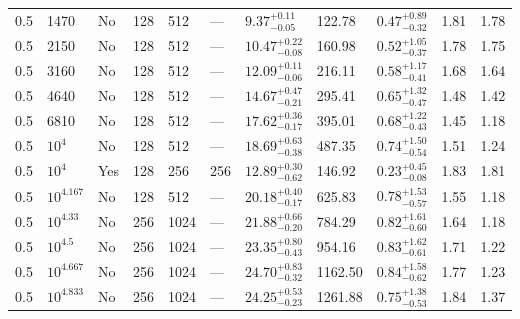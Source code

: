 \documentclass[aps, prfluids, onecolumn, notitlepage, nofootinbib, groupedaddress, amsfonts, amssymb, amsmath]{revtex4-1}
\begin{document}
\begin{center}
\begin{longtable}{ p{1cm} p{1cm} p{1cm} p{1cm} p{1cm} p{1cm} p{1.75cm} p{1.5cm} p{2.75cm} p{1cm} p{1.2cm}  }
\vspace{0.08cm}0.5	&	1470	&	No	&	128	&	512	&	---	&$	9.37	_{-	0.05	}^{+	0.11	}$&	122.78	&$	0.47	_{-	0.32	}^{+	0.89	}$&	1.81	&	1.78	\\
\vspace{0.08cm}0.5	&	2150	&	No	&	128	&	512	&	---	&$	10.47	_{-	0.08	}^{+	0.22	}$&	160.98	&$	0.52	_{-	0.37	}^{+	1.05	}$&	1.78	&	1.75	\\
\vspace{0.08cm}0.5	&	3160	&	No	&	128	&	512	&	---	&$	12.09	_{-	0.06	}^{+	0.11	}$&	216.11	&$	0.58	_{-	0.41	}^{+	1.17	}$&	1.68	&	1.64	\\
\vspace{0.08cm}0.5	&	4640	&	No	&	128	&	512	&	---	&$	14.67	_{-	0.21	}^{+	0.47	}$&	295.41	&$	0.65	_{-	0.47	}^{+	1.32	}$&	1.48	&	1.42	\\
\vspace{0.08cm}0.5	&	6810	&	No	&	128	&	512	&	---	&$	17.62	_{-	0.17	}^{+	0.36	}$&	395.01	&$	0.68	_{-	0.43	}^{+	1.22	}$&	1.45	&	1.18	\\
\vspace{0.08cm}0.5	&	$10^4$	&	No	&	128	&	512	&	---	&$	18.69	_{-	0.38	}^{+	0.63	}$&	487.35	&$	0.74	_{-	0.54	}^{+	1.50	}$&	1.51	&	1.24	\\
\vspace{0.08cm}0.5	&	$10^4$	&	Yes	&	128	&	256	&	256	&$	12.89	_{-	0.62	}^{+	0.30	}$&	146.92	&$	0.23	_{-	0.08	}^{+	0.45	}$&	1.83	&	1.81	\\
\vspace{0.08cm}0.5	&	$10^{4.167}$	&	No	&	128	&	512	&	---	&$	20.18	_{-	0.17	}^{+	0.40	}$&	625.83	&$	0.78	_{-	0.57	}^{+	1.53	}$&	1.55	&	1.18	\\
\vspace{0.08cm}0.5	&	$10^{4.33}$	&	No	&	256	&	1024	&	---	&$	21.88	_{-	0.20	}^{+	0.66	}$&	784.29	&$	0.82	_{-	0.60	}^{+	1.61	}$&	1.64	&	1.18	\\
\vspace{0.08cm}0.5	&	$10^{4.5}$	&	No	&	256	&	1024	&	---	&$	23.35	_{-	0.43	}^{+	0.80	}$&	954.16	&$	0.83	_{-	0.61	}^{+	1.62	}$&	1.71	&	1.22	\\
\vspace{0.08cm}0.5	&	$10^{4.667}$	&	No	&	256	&	1024	&	---	&$	24.70	_{-	0.32	}^{+	0.83	}$&	1162.50	&$	0.84	_{-	0.62	}^{+	1.58	}$&	1.77	&	1.23	\\
\vspace{0.08cm}0.5	&	$10^{4.833}$	&	No	&	256	&	1024	&	---	&$	24.25	_{-	0.23	}^{+	0.53	}$&	1261.88	&$	0.75	_{-	0.53	}^{+	1.38	}$&	1.84	&	1.37	\\

\end{longtable}
\end{center}
\end{document}
